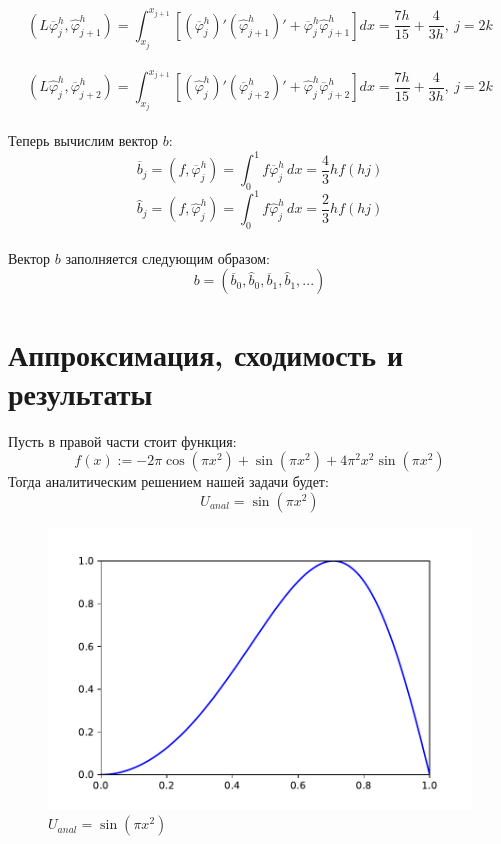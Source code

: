 \documentclass[12pt, a4paper]{article}
\begin{document}
	$$
		(L\overline{\varphi}_j^h, \widehat{\varphi}_{j+1}^h) =
		\int_{x_{j}}^{x_{j+1}} [(\overline{\varphi}_j^h)'(\widehat{\varphi}_{j+1}^h)' +
		\overline{\varphi}_j^h\widehat{\varphi}_{j+1}^h]dx =
		\frac{7h}{15} + \frac{4}{3h},\ j = 2k
	$$\\
	$$
		(L\widehat{\varphi}_j^h, \overline{\varphi}_{j+2}^h) =
		\int_{x_{j}}^{x_{j+1}} [(\widehat{\varphi}_j^h)'(\overline{\varphi}_{j+2}^h)' +
		\widehat{\varphi}_j^h\overline{\varphi}_{j+2}^h]dx =
		\frac{7h}{15} + \frac{4}{3h},\ j = 2k
	$$\\
	Теперь вычислим вектор $b$:
	$$
	\overline{b}_j = (f, \overline{\varphi}_j^h) = 
		\int_{0}^{1} f\overline{\varphi}_j^h \, dx =
		\frac{4}{3} hf(hj) 
	$$
	$$
	\widehat{b}_j = (f, \widehat{\varphi}_j^h) = 
		\int_{0}^{1} f\widehat{\varphi}_j^h \, dx = 
		\frac{2}{3} hf(hj)
	$$\\
	Вектор $b$ заполняется следующим образом:
	$$
		b = (\overline{b}_{0}, \widehat{b}_0, \overline{b}_1, \widehat{b}_1, ...)
	$$
	\vspace{0.5cm}
	\newpage
	
	\section{Аппроксимация, сходимость и результаты}
	\vspace{0.5cm}
	Пусть в правой части стоит функция:\\
	$$
		f(x) := -2\pi \cos (\pi x^2) + \sin (\pi x^2) + 4 \pi^2 x^2 \sin (\pi x^2)
	$$
	Тогда аналитическим решением нашей задачи будет:\\
	$$
		U_{anal} = \sin (\pi x^2)
	$$
	\begin{figure}[h]
		\includegraphics{anal}
		\caption{$U_{anal} = \sin (\pi x^2)$}
	\end{figure}
	
\end{document}
